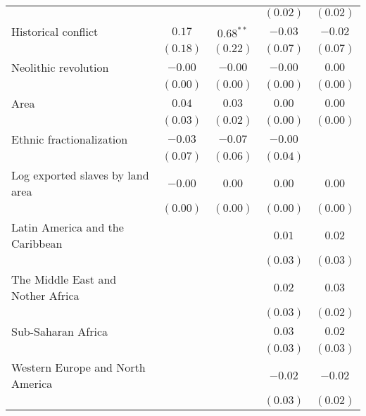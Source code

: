 \begin{table}[H]
\begin{center}
{\begin{tabular}{l c c c c}
                                  &             &                 & $(0.02)$       & $(0.02)$    \\
Historical conflict               & $0.17$      & $0.68^{**}$     & $-0.03$        & $-0.02$     \\
                                  & $(0.18)$    & $(0.22)$        & $(0.07)$       & $(0.07)$    \\
Neolithic revolution              & $-0.00$     & $-0.00$         & $-0.00$        & $0.00$      \\
                                  & $(0.00)$    & $(0.00)$        & $(0.00)$       & $(0.00)$    \\
Area                              & $0.04$      & $0.03$          & $0.00$         & $0.00$      \\
                                  & $(0.03)$    & $(0.02)$        & $(0.00)$       & $(0.00)$    \\
Ethnic fractionalization          & $-0.03$     & $-0.07$         & $-0.00$        &             \\
                                  & $(0.07)$    & $(0.06)$        & $(0.04)$       &             \\
Log exported slaves by land area  & $-0.00$     & $0.00$          & $0.00$         & $0.00$      \\
                                  & $(0.00)$    & $(0.00)$        & $(0.00)$       & $(0.00)$    \\
Latin America and the Caribbean   &             &                 & $0.01$         & $0.02$      \\
                                  &             &                 & $(0.03)$       & $(0.03)$    \\
The Middle East and Nother Africa &             &                 & $0.02$         & $0.03$      \\
                                  &             &                 & $(0.03)$       & $(0.02)$    \\
Sub-Saharan Africa                &             &                 & $0.03$         & $0.02$      \\
                                  &             &                 & $(0.03)$       & $(0.03)$    \\
Western Europe and North America  &             &                 & $-0.02$        & $-0.02$     \\
                                  &             &                 & $(0.03)$       & $(0.02)$    \\

\end{tabular}}
\end{center}
\end{table}
